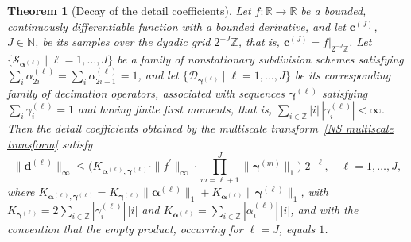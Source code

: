 \documentclass[10pt,a4paper]{amsart}
\newtheorem{theorem}{Theorem}
\begin{document}
\begin{theorem}[Decay of the detail coefficients]\label{thm. details decay}
Let $f\colon \mathbb{R} \rightarrow \mathbb{R}$ be a bounded, continuously differentiable function with a bounded derivative, and let $\boldsymbol{c}^{(J)}$, $J \in \mathbb{N}$, be its samples over the dyadic grid $2^{-J}\mathbb{Z}$, that is, $\boldsymbol{c}^{(J)}=f|_{2^{-J}\mathbb{Z}}$. Let $\{\mathcal{S}_{\boldsymbol{\alpha}^{(\ell)}} \mid \ell=1,\dots,J\}$ be a family of nonstationary subdivision schemes satisfying $\sum_{i}\alpha^{(\ell)}_{2i}=\sum_{i}\alpha^{(\ell)}_{2i+1}=1$, and let $\{\mathcal{D}_{\boldsymbol{\gamma}^{(\ell)}} \mid \ell=1,\dots,J\}$ be its corresponding family of decimation operators, associated with sequences $\boldsymbol{\gamma}^{(\ell)}$ satisfying $\sum_i \gamma^{(\ell)}_i = 1$ and having finite first moments, that is, $\sum_{i\in\mathbb{Z}}|i|\,|\gamma^{(\ell)}_i|<\infty$. Then the detail coefficients obtained by the multiscale transform~\eqref{NS multiscale transform} satisfy
\begin{equation}\label{details bound}
    \|\boldsymbol{d}^{(\ell)}\|_\infty \leq \bigg(K_{\boldsymbol{\alpha}^{(\ell)},\boldsymbol{\gamma}^{(\ell)}} \cdot \|f^\prime\|_\infty \cdot \prod_{m=\ell+1}^J \|\boldsymbol{\gamma}^{(m)}\|_1 \bigg) \; 2^{-\ell}, \quad \ell=1,\dots,J,
\end{equation}
where $K_{\boldsymbol{\alpha}^{(\ell)},\boldsymbol{\gamma}^{(\ell)}}=K_{\boldsymbol{\gamma}^{(\ell)}}\|\boldsymbol{\alpha}^{(\ell)}\|_1+ K_{\boldsymbol{\alpha}^{(\ell)}}\|\boldsymbol{\gamma}^{(\ell)}\|_1$, with $K_{\boldsymbol{\gamma}^{(\ell)}}=2\sum_{i\in\mathbb{Z}} |\gamma^{(\ell)}_i|\,|i|$ and $K_{\boldsymbol{\alpha}^{(\ell)}}=\sum_{i\in\mathbb{Z}} |\alpha^{(\ell)}_i|\,|i|$, and with the convention that the empty product, occurring for $\ell=J$, equals $1$.
\end{theorem}
\end{document}
